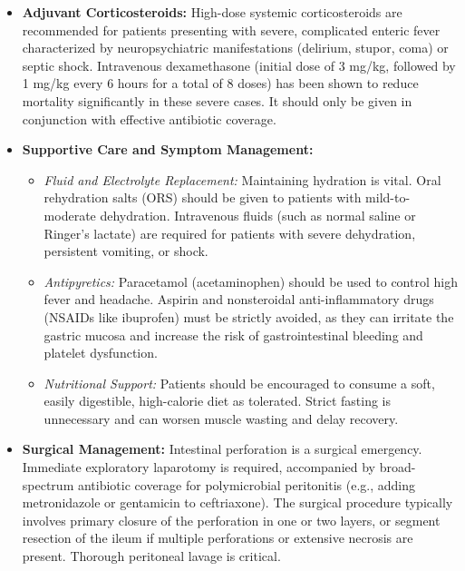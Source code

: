 \begin{itemize}
\begin{itemize}
  \end{itemize}
\item \textbf{Adjuvant Corticosteroids:} High-dose systemic corticosteroids are recommended for patients presenting with severe, complicated enteric fever characterized by neuropsychiatric manifestations (delirium, stupor, coma) or septic shock. Intravenous dexamethasone (initial dose of 3 mg/kg, followed by 1 mg/kg every 6 hours for a total of 8 doses) has been shown to reduce mortality significantly in these severe cases. It should only be given in conjunction with effective antibiotic coverage.
\item \textbf{Supportive Care and Symptom Management:}
  \begin{itemize}
  \item \textit{Fluid and Electrolyte Replacement:} Maintaining hydration is vital. Oral rehydration salts (ORS) should be given to patients with mild-to-moderate dehydration. Intravenous fluids (such as normal saline or Ringer's lactate) are required for patients with severe dehydration, persistent vomiting, or shock.
  \item \textit{Antipyretics:} Paracetamol (acetaminophen) should be used to control high fever and headache. Aspirin and nonsteroidal anti-inflammatory drugs (NSAIDs like ibuprofen) must be strictly avoided, as they can irritate the gastric mucosa and increase the risk of gastrointestinal bleeding and platelet dysfunction.
  \item \textit{Nutritional Support:} Patients should be encouraged to consume a soft, easily digestible, high-calorie diet as tolerated. Strict fasting is unnecessary and can worsen muscle wasting and delay recovery.
  \end{itemize}
\item \textbf{Surgical Management:} Intestinal perforation is a surgical emergency. Immediate exploratory laparotomy is required, accompanied by broad-spectrum antibiotic coverage for polymicrobial peritonitis (e.g., adding metronidazole or gentamicin to ceftriaxone). The surgical procedure typically involves primary closure of the perforation in one or two layers, or segment resection of the ileum if multiple perforations or extensive necrosis are present. Thorough peritoneal lavage is critical.
\end{itemize}

